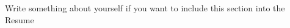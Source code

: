 

\begin{cvparagraph}

Write something about yourself if you want to include this section into the Resume

\end{cvparagraph}